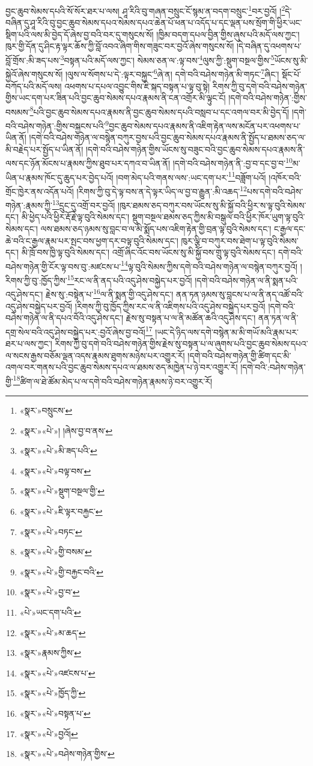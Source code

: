 བྱང་ཆུབ་སེམས་དཔའི་སོ་སོར་ཐར་པ་ལས། ཤཱ་རིའི་བུ་གཞན་བསྲུང་ངོ་སྙམ་ན་བདག་བསྲུང་\footnote{«སྣར་»བསྲུངས་}བར་བྱའོ། །\footnote{«སྣར་»«པེ་»། །ཞེས་བྱ་བ་ནས་}དེ་བཞིན་དུ་ཤཱ་རིའི་བུ་བྱང་ཆུབ་སེམས་དཔའ་སེམས་དཔའ་ཆེན་པོ་ཕན་པ་འདོད་པ་དང་ལྡན་པས་སྲོག་གི་ཕྱིར་ཡང་སྡིག་པའི་ལས་མི་བྱེད་དོ་ཞེས་བྱ་བའི་བར་དུ་གསུངས་སོ། །ཁྱིམ་བདག་དཔལ་བྱིན་གྱིས་ཞུས་པའི་མདོ་ལས་ཀྱང་། ཁུར་གྱི་དོན་དུ་ཤིང་རྟ་ལྟར་ཆོས་ཀྱི་བློ་འབའ་ཞིག་གིས་གཟུང་བར་བྱའོ་ཞེས་གསུངས་སོ། །དེ་བཞིན་དུ་འཕགས་པ་བློ་གྲོས་:མི་ཟད་པས་\footnote{«སྣར་»«པེ་»མི་ཟད་པའི་}བསྟན་པའི་མདོ་ལས་ཀྱང་། སེམས་ཅན་ལ་:ལྟ་བས་\footnote{«སྣར་»«པེ་»བལྟ་བས་}ལུས་ཀྱི་:སྡུག་བསྔལ་གྱིས་\footnote{«སྣར་»«པེ་»སྡུག་བསྔལ་གྱི་}ཡོངས་སུ་མི་སྐྱེའོ་ཞེས་གསུངས་སོ། །ལུས་ལ་སོགས་པ་དེ་:ལྟར་བསྐྱང་\footnote{«སྣར་»«པེ་»ཇི་ལྟར་བརྐྱང་}ཞེ་ན། དགེ་བའི་བཤེས་གཉེན་མི་གཏང་\footnote{«སྣར་»«པེ་»བཏང་}ཞིང་། སྡོང་པོ་བཀོད་པའི་མདོ་ལས། འཕགས་པ་དཔལ་འབྱུང་གིས་ཇི་སྐད་བསྟན་པ་ལྟ་བུ་སྟེ། རིགས་ཀྱི་བུ་དགེ་བའི་བཤེས་གཉེན་གྱིས་ཡང་དག་པར་ཟིན་པའི་བྱང་ཆུབ་སེམས་དཔའ་རྣམས་ནི་ངན་འགྲོར་མི་ལྟུང་ངོ། །དགེ་བའི་བཤེས་གཉེན་:གྱིས་བསམས་\footnote{«སྣར་»«པེ་»གྱི་བསམ་}པའི་བྱང་ཆུབ་སེམས་དཔའ་རྣམས་ནི་བྱང་ཆུབ་སེམས་དཔའི་བསླབ་པ་དང་འགལ་བར་མི་བྱེད་དོ། །དགེ་བའི་བཤེས་གཉེན་:གྱིས་བསྐྱངས་པའི་\footnote{«སྣར་»«པེ་»གྱི་བརྐྱང་བའི་}བྱང་ཆུབ་སེམས་དཔའ་རྣམས་ནི་འཇིག་རྟེན་ལས་མངོན་པར་འཕགས་པ་ཡིན་ནོ། །དགེ་བའི་བཤེས་གཉེན་ལ་བསྙེན་བཀུར་བྱས་པའི་བྱང་ཆུབ་སེམས་དཔའ་རྣམས་ནི་སྤྱོད་པ་ཐམས་ཅད་ལ་མི་བརྗེད་པར་སྤྱོད་པ་ཡིན་ནོ། །དགེ་བའི་བཤེས་གཉེན་གྱིས་ཡོངས་སུ་བཟུང་བའི་བྱང་ཆུབ་སེམས་དཔའ་རྣམས་ནི་ལས་དང་ཉོན་མོངས་པ་རྣམས་ཀྱིས་ཐུབ་པར་དཀའ་བ་ཡིན་ནོ། །དགེ་བའི་བཤེས་གཉེན་ནི་:བྱ་བ་དང་བྱ་བ་\footnote{«སྣར་»«པེ་»བྱ་བ་}མ་ཡིན་པ་རྣམས་ཁོང་དུ་ཆུད་པར་བྱེད་པའོ། །བག་མེད་པའི་གནས་ལས་:ཡང་དག་པར་\footnote{«པེ་»ཡང་དག་པའི་}བཟློག་པའོ། །འཁོར་བའི་གྲོང་ཁྱེར་ནས་འདོན་པའོ། །རིགས་ཀྱི་བུ་དེ་ལྟ་བས་ན་དེ་ལྟར་ཡིད་ལ་བྱ་བ་རྒྱུན་:མི་འཆད་\footnote{«སྣར་»«པེ་»མ་ཆད་}པས་དགེ་བའི་བཤེས་གཉེན་:རྣམས་ཀྱི་\footnote{«སྣར་»རྣམས་ཀྱིས་}དྲུང་དུ་འགྲོ་བར་བྱའོ། །ཁུར་ཐམས་ཅད་བཀུར་བས་ཡོངས་སུ་མི་སྐྱོ་བའི་ཕྱིར་ས་ལྟ་བུའི་སེམས་དང་། མི་ཕྱེད་པའི་ཕྱིར་རྡོ་རྗེ་ལྟ་བུའི་སེམས་དང་། སྡུག་བསྔལ་ཐམས་ཅད་ཀྱིས་མི་བསྒུལ་བའི་ཕྱིར་ཁོར་ཡུག་ལྟ་བུའི་སེམས་དང་། ལས་ཐམས་ཅད་ཉམས་སུ་བླང་བ་ལ་མི་སྨོད་པས་འཇིག་རྟེན་གྱི་བྲན་ལྟ་བུའི་སེམས་དང་། ང་རྒྱལ་དང་ཆེ་བའི་ང་རྒྱལ་རྣམ་པར་སྤང་བས་ཕྱག་དར་བལྟ་བུའི་སེམས་དང་། ཁུར་ལྕི་བ་བཀུར་བས་ཐེག་པ་ལྟ་བུའི་སེམས་དང་། མི་ཁྲོ་བས་ཁྱི་ལྟ་བུའི་སེམས་དང་། འགྲོ་ཞིང་འོང་བས་ཡོངས་སུ་མི་སྐྱོ་བས་གྲུ་ལྟ་བུའི་སེམས་དང་། དགེ་བའི་བཤེས་གཉེན་གྱི་ངོར་ལྟ་བས་བུ་:མཛངས་པ་\footnote{«སྣར་»«པེ་»འཛངས་པ་}ལྟ་བུའི་སེམས་ཀྱིས་དགེ་བའི་བཤེས་གཉེན་ལ་བསྙེན་བཀུར་བྱའོ། །རིགས་ཀྱི་བུ་:ཁྱོད་ཀྱིས་\footnote{«སྣར་»«པེ་»ཁྱོད་ཀྱི་}རང་ལ་ནི་ནད་པའི་འདུ་ཤེས་བསྐྱེད་པར་བྱའོ། །དགེ་བའི་བཤེས་གཉེན་ལ་ནི་སྨན་པའི་འདུ་ཤེས་དང་། རྗེས་སུ་:བསྟེན་པ་\footnote{«སྣར་»«པེ་»བསྟན་པ་}ལ་ནི་སྨན་གྱི་འདུ་ཤེས་དང་། ནན་ཏན་ཉམས་སུ་བླངས་པ་ལ་ནི་ནད་འཚོ་བའི་འདུ་ཤེས་བསྐྱེད་པར་བྱའོ། །རིགས་ཀྱི་བུ་ཁྱོད་ཀྱིས་རང་ལ་ནི་འཇིགས་པའི་འདུ་ཤེས་བསྐྱེད་པར་བྱའོ། །དགེ་བའི་བཤེས་གཉེན་ལ་ནི་དཔའ་བོའི་འདུ་ཤེས་དང་། རྗེས་སུ་བསྟན་པ་ལ་ནི་མཚོན་ཆའི་འདུ་ཤེས་དང་། ནན་ཏན་ལ་ནི་དགྲ་སེལ་བའི་འདུ་ཤེས་བསྐྱེད་པར་:བྱའོ་ཞེས་བྱ་བའོ།\footnote{«སྣར་»«པེ་»བྱའོ།} །ཡང་དེ་ཉིད་ལས་དགེ་བསྙེན་མ་མི་གཡོ་མའི་རྣམ་པར་ཐར་པ་ལས་ཀྱང་། རིགས་ཀྱི་བུ་དགེ་བའི་བཤེས་གཉེན་གྱིས་རྗེས་སུ་བསྟན་པ་ལ་ཞུགས་པའི་བྱང་ཆུབ་སེམས་དཔའ་ལ་སངས་རྒྱས་བཅོམ་ལྡན་འདས་རྣམས་ཐུགས་མཉེས་པར་འགྱུར་རོ། །དགེ་བའི་བཤེས་གཉེན་གྱི་ཚིག་དང་མི་འགལ་བར་གནས་པའི་བྱང་ཆུབ་སེམས་དཔའ་ལ་ཐམས་ཅད་མཁྱེན་པ་ཉེ་བར་འགྱུར་རོ། །དགེ་བའི་:བཤེས་གཉེན་གྱི་\footnote{«སྣར་»«པེ་»བཤེས་གཉེན་གྱིས་}ཚིག་ལ་ཐེ་ཚོམ་མེད་པ་ལ་དགེ་བའི་བཤེས་གཉེན་རྣམས་ཉེ་བར་འགྱུར་རོ། 